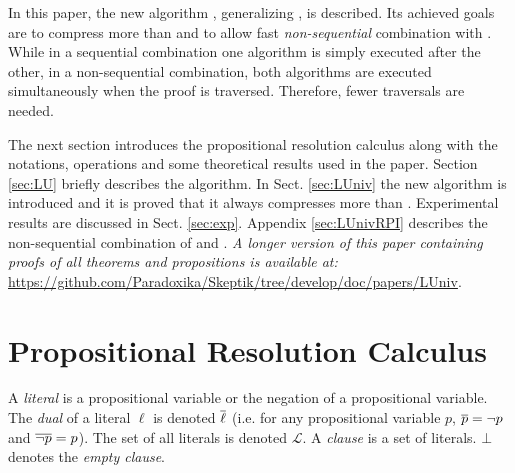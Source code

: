 \documentclass{easychair}
\begin{document}
In this paper, the new algorithm {\LowerUnivalents}, generalizing {\LowerUnits}, is described. Its achieved
goals are to compress more than {\LowerUnits} and to allow fast \emph{non-sequential}  combination
with {\RPI}. While in a sequential combination one algorithm is simply executed after the other, in
a non-sequential combination, both algorithms are executed simultaneously when the proof is
traversed. Therefore, fewer traversals are needed.

The next section introduces the propositional resolution calculus along with the notations,
operations and some theoretical results used in the paper. Section \ref{sec:LU} briefly describes
the {\LowerUnits} algorithm. In Sect. \ref{sec:LUniv} the new algorithm {\LowerUnivalents} is
introduced and it is proved that it always compresses more than {\LowerUnits}. Experimental results are discussed in Sect. \ref{sec:exp}. Appendix
\ref{sec:LUnivRPI} describes the non-sequential combination of {\LowerUnivalents} and {\RPI}. \emph{A longer version of this paper containing proofs of all theorems and propositions is available at:} \url{https://github.com/Paradoxika/Skeptik/tree/develop/doc/papers/LUniv}.



\section{Propositional Resolution Calculus}

A \emph{literal} is a propositional variable or the negation of a propositional variable. The
\emph{dual} of a literal $\ell$ is denoted $\overline{\ell}$ (i.e. for any propositional variable $p$,
$\overline{p} = \neg p$ and $\overline{\neg p} = p$). The set of all literals is denoted $\mathcal{L}$. A
\emph{clause} is a set of literals. $\bot$ denotes the \emph{empty clause}.


\newcommand{\axiom}[1]{\widehat{#1}}
\newcommand{\n}{v}
\newcommand{\raiz}[1]{\rho(#1)}
\end{document}
